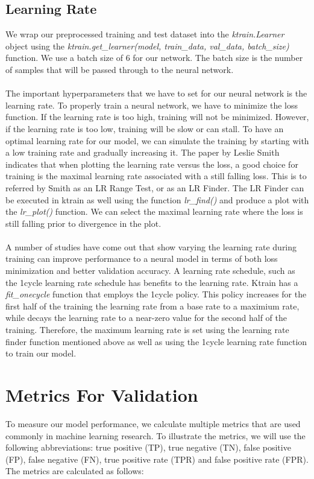 \subsection{Learning Rate}
We wrap our preprocessed training and test dataset into the \textit{ktrain.Learner} object using the \textit{ktrain.get\_learner(model, train\_data, val\_data, batch\_size)} function. We use a batch size of 6 for our network. The batch size is the number of samples that will be passed through to the neural network.\\\\
The important hyperparameters that we have to set for our neural network is the learning rate. To properly train a neural network, we have to minimize the loss function. If the learning rate is too high, training will not be minimized. However, if the learning rate is too low, training will be slow or can stall. 
To have an optimal learning rate for our model, we can simulate the training by starting with a low training rate and gradually increasing it. The paper by Leslie Smith \cite{Learning_Rate} indicates that when plotting the learning rate versus the loss, a good choice for training is the maximal learning rate associated with a still falling loss. This is to referred by Smith as an LR Range Test, or as an LR Finder. The LR Finder can be executed in ktrain as well using the function \textit{lr\_find()} and produce a plot with the \textit{lr\_plot()} function. We can select the maximal learning rate where the loss is still falling prior to divergence in the plot.\\\\ 
A number of studies have come out that show varying the learning rate during training can improve performance to a neural model in terms of both loss minimization and better validation accuracy. A learning rate schedule, such as the 1cycle learning rate schedule \cite{cycle_learning_rate} has benefits to the learning rate. Ktrain has a \textit{fit\_onecycle} function that employs the 1cycle policy. This policy increases for the first half of the training  the learning rate from a base rate to a maximium rate, while decays the learning rate to a near-zero value for the second half of the training. Therefore, the maximum learning rate is set using the learning rate finder function mentioned above as well as using the 1cycle learning rate function to train our model. 

\section{Metrics For Validation}
To measure our model performance, we calculate multiple metrics that are used commonly in machine learning research. To illustrate the metrics, we will use the following abbreviations: true positive (TP), true negative (TN), false positive (FP), false negative (FN), true positive rate (TPR) and false positive rate (FPR). The metrics are calculated as follows:

